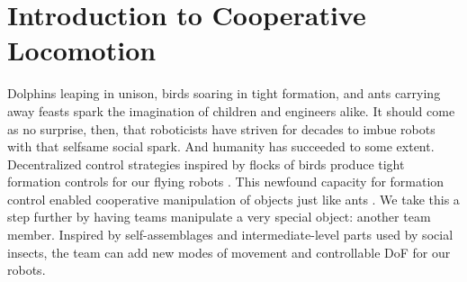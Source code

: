 \documentclass[letterpaper]{report}
\begin{document}
\section{Introduction to Cooperative Locomotion}
Dolphins leaping in unison, birds soaring in tight formation, and ants carrying away feasts spark the imagination of children and engineers alike.
It should come as no surprise, then, that roboticists have striven for decades to imbue robots with that selfsame social spark.
And humanity has succeeded to some extent.
Decentralized control strategies inspired by flocks of birds \cite{reynolds1987flocks} produce tight formation controls for our flying robots \cite{RealBoids}.
This newfound capacity for formation control enabled cooperative manipulation of objects \cite{rus1995moving,sugar2002control,spletzer2001cooperative,song2002potential} just like ants \cite{kube2000cooperative}.
We take this a step further by having teams manipulate a very special object: another team member.
Inspired by self-assemblages \cite{Anderson2002} and intermediate-level parts \cite{Anderson2001} used by social insects, the team can add new modes of movement and controllable DoF for our robots.
\end{document}
